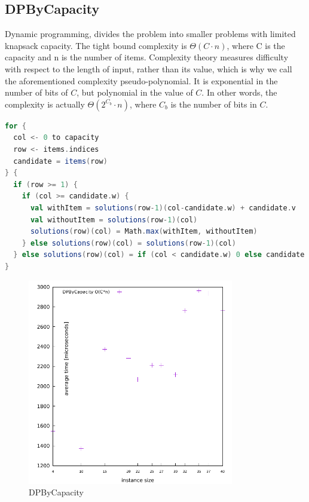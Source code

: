 \documentclass[a4paper,10pt,twocolumn]{article}
\begin{document}
\subsection{DPByCapacity}
Dynamic programming, divides the problem into smaller problems with limited knapsack capacity. The tight bound
complexity is $\Theta(C \cdot n)$, where C is the capacity and n is the number of items. Complexity theory measures
difficulty with respect to the length of input, rather than its value, which is why we call the aforementioned
complexity pseudo-polynomial. It is exponential in the number of bits of $C$, but polynomial in the value of $C$. In
other words, the complexity is actually $\Theta(2^{C_b} \cdot n)$, where $C_b$ is the number of bits in $C$.

\begin{lstlisting}[frame=tlrb,language=scala,basicstyle=\scriptsize,label=dpByCapacityCode,caption=DPByCapacity]
for {
  col <- 0 to capacity
  row <- items.indices
  candidate = items(row)
} {
  if (row >= 1) {
    if (col >= candidate.w) {
      val withItem = solutions(row-1)(col-candidate.w) + candidate.v
      val withoutItem = solutions(row-1)(col)
      solutions(row)(col) = Math.max(withItem, withoutItem)
    } else solutions(row)(col) = solutions(row-1)(col)
  } else solutions(row)(col) = if (col < candidate.w) 0 else candidate.v
}
\end{lstlisting}

\begin{figure}[H]
  \begin{center}
    \hspace*{-0.5cm}\includegraphics[width=9cm,height=9cm]{gnuplot/pdf/DPByCapacity.pdf}
  \end{center}
  \caption{DPByCapacity}\label{dpByCapacityPlot}
\end{figure}
\end{document}
